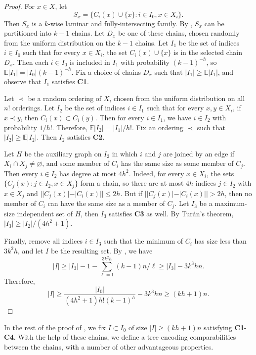 \documentclass[11pt]{article}
\theoremstyle{definition}
\begin{document}
\begin{proof}
    For $x\in X$, let 
    $$S_x=\{C_i(x)\cup\{x\}:i\in I_0,x\in X_i\}.$$ Then $S_x$ is a $k$-wise laminar  and fully-intersecting family. By , $S_x$ can be partitioned into $k-1$ chains. Let $D_x$ be one of these chains, chosen randomly from the uniform distribution on the $k-1$ chains. Let $I_1$ be the set of indices $i\in I_0$ such that for every $x\in X_i$, the set $C_i(x)\cup\{x\}$ is in the selected chain $D_x$. Then each $i\in I_0$ is included in $I_1$ with probability $(k-1)^{-h}$, so $\mathbb{E} |I_1|=|I_0|(k-1)^{-h}$. Fix a choice of chains $D_x$ such that $|I_1|\geq \mathbb{E} |I_1|$, and observe that $I_1$ satisfies \textbf{C1}.

    Let $\prec$ be a random ordering of $X$, chosen from the uniform distribution on all $n!$ orderings. Let $I_2$ be the set of indices $i\in I_1$ such that for every $x,y\in X_i$, if $x\prec y$, then $C_i(x)\subset C_i(y)$. Then for every $i\in I_1$, we have $i\in I_2$ with probability $1/h!$. Therefore,  $\mathbb{E}|I_2|=|I_1|/h!$. Fix an ordering $\prec$ such that $|I_2|\geq \mathbb{E}|I_2|$. Then $I_2$ satisfies \textbf{C2}.

    Let $H$ be the auxiliary graph on $I_2$ in which $i$ and $j$ are joined by an edge if $X_i\cap X_j\neq \varnothing$, and some member of $C_i$ has the same size as some member of $C_j$. Then every $i\in I_2$ has degree at most $4h^2$. Indeed, for every $x\in X_i$, the sets $\{C_j(x):j\in I_2,x\in X_j\}$ form a chain, so there are at most $4h$ indices $j\in I_2$ with $x\in X_j$ and $||C_j(x)|-|C_i(x)||\leq 2h$. But if $||C_j(x)|-|C_i(x)||>2h$, then no member of $C_i$ can have the same size as a member of $C_j$. Let $I_3$ be a maximum-size independent set of $H$, then $I_3$ satisfies \textbf{C3} as well. By Tur\'an's theorem, $|I_3|\geq |I_2|/(4h^2+1)$.
    
    Finally, remove all indices $i\in I_3$ such that the minimum of $C_i$ has size less than $3k^2h$, and let $I$ be the resulting set. By , we have $$|I|\geq |I_3|-1-\sum_{\ell=1}^{3k^2h}(k-1) n/\ell\geq |I_3|-3k^3hn.$$
    Therefore, $$|I|\geq \frac{|I_0|}{(4h^2+1)h!(k-1)^h}-3k^3hn\geq (kh+1)n.$$
 \end{proof}

In the rest of the proof of , we fix $I\subset I_0$ of size $|I|\geq (kh+1)n$ satisfying \textbf{C1}-\textbf{C4}. With the help of these chains, we define a tree encoding comparabilities between the chains, with a number of other advantageous properties.
\end{document}
